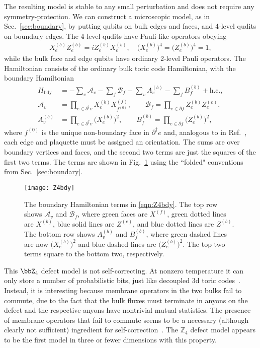 The resulting model is stable to any small perturbation and does not require any symmetry-protection. We can construct a microscopic model, as in Sec.~\ref{sec:boundary}, by putting qubits on bulk edges and faces, and 4-level qudits on boundary edges. The 4-level qudits have Pauli-like operators obeying
\begin{align}
X^{(b)}_e Z^{(b)}_e = i Z^{(b)}_e X^{(b)}_e, \quad \big( X^{(b)}_e \big)^4  = \big( Z^{(b)}_e \big)^4 = 1,
\end{align}
while the bulk face and edge qubits have ordinary 2-level Pauli operators.
The Hamiltonian consists of the ordinary bulk toric code Hamiltonian, with the boundary Hamiltonian 
\begin{align}
H_\text{bdy} &= -\sum_v \mathcal{A}_v - \sum_f \mathcal{B}_f - \sum_v A_v^{(b)} - \sum_f B_f^{(b)} + \text{h.c.}, \nonumber\\
\mathcal{A}_v &= \prod_{e\in \partial^\dag v} X^{(b)}_e X^{(f)}_{f^{(0)}}, \qquad \mathcal{B}_f = \prod_{e \in \partial f} Z^{(b)}_e Z^{(e)}_e,\nonumber\\
A_v^{(b)} &= \prod_{e\in \partial^\dag v} \big( X^{(b)}_e \big)^2, \qquad B_f^{(b)} = \prod_{e\in \partial f} \big( Z^{(b)}_e \big)^2, \label{eqn:Z4bdy}
\end{align}
where $f^{(0)}$ is the unique non-boundary face in $\partial^\dag e$ and, analogous to in Ref.~\cite{Kitaev2003Fault}, each edge and plaquette must be assigned an orientation.
The sums are over boundary vertices and faces, and the second two terms are just the squares of the first two terms. The terms are shown in Fig.~\ref{fig:Z4bdy} using the ``folded" conventions from Sec.~\ref{sec:boundary}.  

\begin{figure}[thb!]
    \centering
    \texttt{[image: Z4bdy]}
    \caption[Boundary for the $\bbZ_4$ model]{The boundary Hamiltonian terms in \eqref{eqn:Z4bdy}. The top row shows $\mathcal{A}_v$ and $\mathcal{B}_f$, where green faces are $X^{(f)}$, green dotted lines are $X^{(b)}$, blue solid lines are $Z^{(e)}$, and blue dotted lines are $Z^{(b)}$. The bottom row shows $A^{(b)}_v$ and $B^{(b)}_f$, where green dashed lines are now $\big( X^{(b)}_e \big)^2$ and blue dashed lines are $\big( Z^{(b)}_e \big)^2$. The top two terms square to the bottom two, respectively.}
    \label{fig:Z4bdy}
\end{figure}

This $\bbZ_4$ defect model is not self-correcting. At nonzero temperature it can only store a number of probabilistic bits, just like decoupled 3d toric codes~\cite{CastelnovoChamon2008}. Instead, it is interesting because membrane operators in the two bulks fail to commute, due to the fact that the bulk fluxes must terminate in anyons on the defect and the respective anyons have nontrivial mutual statistics. The presence of membrane operators that fail to commute seems to be a necessary (although clearly not sufficient) ingredient for self-correction~\cite{Dennis2002Topological, RobertsBartlett2020}. The $\mathbb{Z}_4$ defect model appears to be the first model in three or fewer dimensions with this property.

